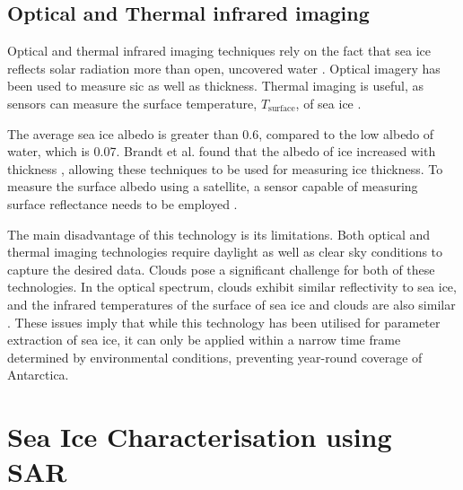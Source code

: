 \subsection{Optical and Thermal infrared imaging} \label{subsec:litReview.seaIceCharac.opticalThermal}

Optical and thermal infrared imaging techniques rely on the fact that sea ice reflects solar radiation more than open, uncovered water \cite{Thomas2017Chap9}. Optical imagery has been used to measure \acs{sic} \cite{Emery1994} as well as thickness. Thermal imaging is useful, as sensors can measure the surface temperature, $T_{\text{surface}}$, of sea ice \cite{Thomas2017Chap9}.

The average sea ice albedo is greater than 0.6, compared to the low albedo of water, which is 0.07. Brandt et al. found that the albedo of ice increased with thickness \cite{Thomas2017Chap9,Brandt2005}, allowing these techniques to be used for measuring ice thickness. To measure the surface albedo using a satellite, a sensor capable of measuring surface reflectance needs to be employed \cite{Thomas2017Chap9}.

The main disadvantage of this technology is its limitations. Both optical and thermal imaging technologies require daylight as well as clear sky conditions to capture the desired data. Clouds pose a significant challenge for both of these technologies. In the optical spectrum, clouds exhibit similar reflectivity to sea ice, and the infrared temperatures of the surface of sea ice and clouds are also similar \cite{Thomas2017Chap9}. These issues imply that while this technology has been utilised for parameter extraction of sea ice, it can only be applied within a narrow time frame determined by environmental conditions, preventing year-round coverage of Antarctica.

\section{Sea Ice Characterisation using SAR} 
\label{sec:litReview.sarCharac}

